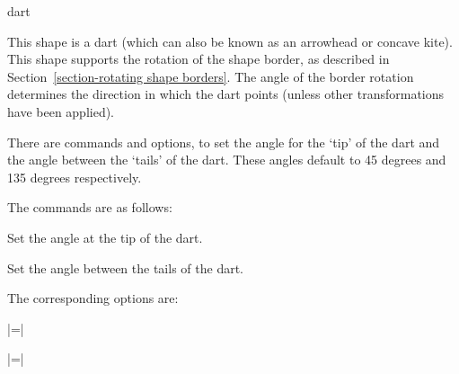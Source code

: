 \begin{shape}{dart}


	This shape is a dart (which can also be known as an arrowhead or
	concave kite). This shape supports the rotation of the shape border, 
	as described in Section~\ref{section-rotating shape borders}. 
	The angle of the border rotation determines the direction in which 
	the dart points (unless other transformations have been applied).
	
	There are \pgfname{} commands and \tikzname{} options, to set the 
	angle for the `tip' of the dart and the angle between the `tails'
	of the dart. These angles default to 45 degrees and 135 degrees 
	respectively.

\begin{codeexample}[]
\end{codeexample}

	The \pgfname{} commands are as follows:
	
	\begin{command}{\pgfsetdarttipangle{}}
		Set the angle at the tip of the dart.
	\end{command}
	
	\begin{command}{\pgfsetdarttailangle{}}
		Set the angle between the tails of the dart.
	\end{command}
	
	The corresponding \tikzname{} options are:
	
	\begin{itemize}
		|=|
		
		|=|		
	\end{itemize}
	

\end{shape}
